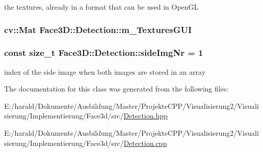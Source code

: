 the textures, already in a format that can be used in Open\+GL 

\subsubsection[{\texorpdfstring{m\+\_\+\+Textures\+G\+UI}{m_TexturesGUI}}]{\setlength{\rightskip}{0pt plus 5cm}cv\+::\+Mat Face3\+D\+::\+Detection\+::m\+\_\+\+Textures\+G\+UI\hspace{0.3cm}{\ttfamily [private]}}\hypertarget{class_face3_d_1_1_detection_aac17e78111f48d10d80316dc1e0b7e76}{}\label{class_face3_d_1_1_detection_aac17e78111f48d10d80316dc1e0b7e76}
\subsubsection[{\texorpdfstring{side\+Img\+Nr}{sideImgNr}}]{\setlength{\rightskip}{0pt plus 5cm}const size\+\_\+t Face3\+D\+::\+Detection\+::side\+Img\+Nr = 1\hspace{0.3cm}{\ttfamily [private]}}\hypertarget{class_face3_d_1_1_detection_a7a2e671e0ba9133f1fd8e877bc5a89f9}{}\label{class_face3_d_1_1_detection_a7a2e671e0ba9133f1fd8e877bc5a89f9}


index of the side image when both images are stored in an array 



The documentation for this class was generated from the following files\+:\begin{DoxyCompactItemize}
\item 
E\+:/harald/\+Dokumente/\+Ausbildung/\+Master/\+Projekte\+C\+P\+P/\+Visualisierung2/\+Visualisierung/\+Implementierung/\+Face3d/src/\hyperlink{_detection_8hpp}{Detection.\+hpp}\item 
E\+:/harald/\+Dokumente/\+Ausbildung/\+Master/\+Projekte\+C\+P\+P/\+Visualisierung2/\+Visualisierung/\+Implementierung/\+Face3d/src/\hyperlink{_detection_8cpp}{Detection.\+cpp}\end{DoxyCompactItemize}
